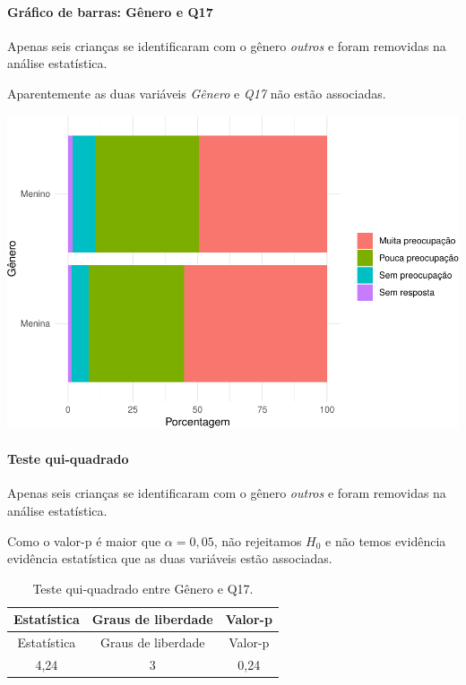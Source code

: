 \documentclass[]{article}
\let\oldparagraph\paragraph
\renewcommand{\paragraph}[1]{\oldparagraph{#1}\mbox{}}
\begin{document}
\hypertarget{gruxe1fico-de-barras-guxeanero-e-q17}{%
\paragraph{Gráfico de barras: Gênero e Q17}\label{gruxe1fico-de-barras-guxeanero-e-q17}}

Apenas seis crianças se identificaram com o gênero \emph{outros} e foram removidas na análise estatística.

Aparentemente as duas variáveis \emph{Gênero} e \emph{Q17} não estão associadas.

\begin{center}\includegraphics[width=0.75\linewidth]{relatorio_files/figure-latex/unnamed-chunk-189-1} \end{center}

\hypertarget{teste-qui-quadrado-19}{%
\paragraph{Teste qui-quadrado}\label{teste-qui-quadrado-19}}

Apenas seis crianças se identificaram com o gênero \emph{outros} e foram removidas na análise estatística.

Como o valor-p é maior que \(\alpha=0,05\), não rejeitamos \(H_0\) e não temos evidência evidência estatística que as duas variáveis estão associadas.

\begin{longtable}[]{@{}ccc@{}}
\caption{\label{tab:unnamed-chunk-190}Teste qui-quadrado entre Gênero e Q17.}\tabularnewline
\toprule
Estatística & Graus de liberdade & Valor-p\tabularnewline
\midrule
\endfirsthead
\toprule
Estatística & Graus de liberdade & Valor-p\tabularnewline
\midrule
\endhead
4,24 & 3 & 0,24\tabularnewline
\bottomrule
\end{longtable}
\end{document}
